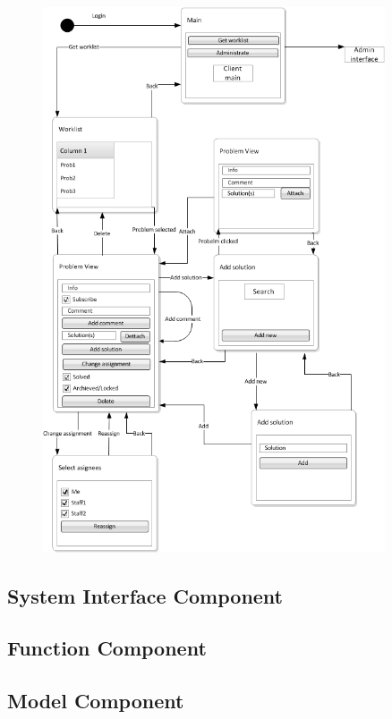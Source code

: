 \begin{figure}[htbp]
	\centering
		\includegraphics[width=0.90\textwidth]{input/component_design/Navigation_Diagram.jpg}
	\caption{\sinterface[c]}
	\label{fig:Navigation_Diagram}
\end{figure}


\subsubsection{\ainterface[]}

\subsection{System Interface Component}


\subsection{Function Component}


\subsection{Model Component}
